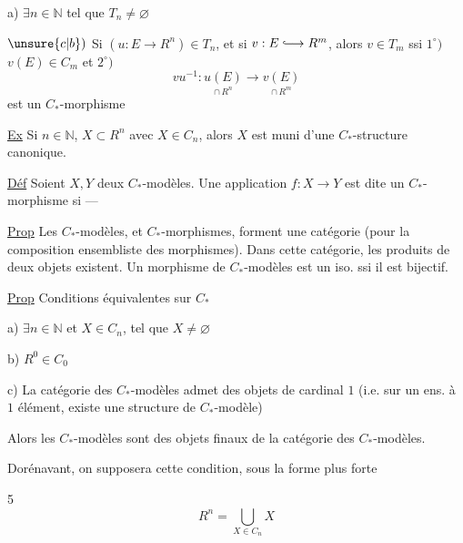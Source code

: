 a) $\exists n\in\mathbb N$ tel que $T_n\ne\varnothing$


$\unsure{c|b})$ Si  $(u:E\to R^n)\in T_n$, et si $v:E\lhook\joinrel\longrightarrow R^m$, alors $v\in T_m$ ssi $1^\circ)$ $v(E)\in C_m$ et $2^\circ)$
\[
vu^{-1}:\underset{\cap\,R^n}{u(E)}
\longrightarrow\underset{\cap\,R^m}{v(E)}
\]
est un $C_*$-morphisme


\uline{Ex} Si $n\in\mathbb N$, $X\subset R^n$ avec $X\in C_n$, alors $X$ est muni d'une $C_*$-structure canonique.

\uline{Déf} Soient $X,Y$ deux $C_*$-modèles. Une application $f:X\to Y$ est dite un $C_*$-morphisme si ---

\uline{Prop} Les  $C_*$-modèles, et $C_*$-morphismes, forment une catégorie (pour la composition ensembliste des morphismes).
Dans cette catégorie, les produits  de deux objets existent.
Un morphisme de $C_*$-modèles est un iso. ssi il est bijectif.

\uline{Prop} Conditions équivalentes sur $C_*$

a)  $\exists n\in\mathbb N$ et $X\in C_n$, tel que $X\ne\varnothing$

b) $R^0\in C_0$

c) La catégorie des $C_*$-modèles admet des objets de cardinal $1$ (i.e. sur un ens. à $1$ élément, existe une structure de $C_*$-modèle)

Alors les  $C_*$-modèles  sont des objets finaux de la catégorie des $C_*$-modèles.

Dorénavant, on supposera cette condition, sous la forme plus forte

\textcircled{5} 
\[
R^n=\bigcup_{X\in C_n}X
\]

